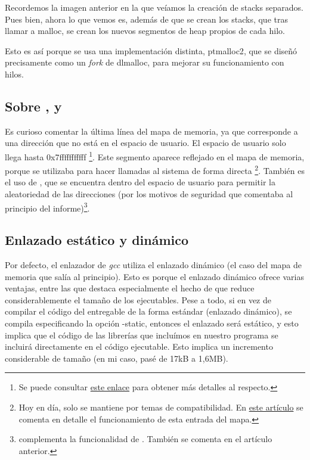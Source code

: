 \documentclass[a4paper]{article}
\begin{document}
Recordemos la imagen anterior en la que veíamos la creación de stacks separados. Pues bien, ahora lo que vemos es, además de que se crean los stacks, que tras llamar a {\ttfamily malloc}, se crean los nuevos segmentos de heap propios de cada hilo.

Esto es así porque se usa una implementación distinta, {\ttfamily ptmalloc2}, que se diseñó precisamente como un \emph{fork} de {\ttfamily dlmalloc}, para mejorar su funcionamiento con hilos.

\subsection{Sobre {\ttfamily [vsyscall]}, {\ttfamily [vdso]} y {\ttfamily [vvar]}}

Es curioso comentar la última línea del mapa de memoria, ya que corresponde a una dirección que no está en el espacio de usuario. El espacio de usuario solo llega hasta {\ttfamily 0x7fffffffffff} \footnote{Se puede consultar \href{https://www.kernel.org/doc/Documentation/x86/x86_64/mm.txt}{este enlace} para obtener más detalles al respecto.}. Este segmento aparece reflejado en el mapa de memoria, porque se utilizaba para hacer llamadas al sistema de forma directa \footnote{Hoy en día, solo se mantiene por temas de compatibilidad. En \href{https://lwn.net/Articles/446528/}{este artículo} se comenta en detalle el funcionamiento de esta entrada del mapa.}. También es el uso de {\ttfamily [vdso]}, que se encuentra dentro del espacio de usuario para permitir la aleatoriedad de las direcciones (por los motivos de seguridad que comentaba al principio del informe)\footnote{{\ttfamily [vvar]} complementa la funcionalidad de {\ttfamily [vdso]}. También se comenta en el artículo anterior.}.

\subsection{Enlazado estático y dinámico}

Por defecto, el enlazador de \emph{gcc} utiliza el enlazado dinámico (el caso del mapa de memoria que salía al principio). Esto es porque el enlazado dinámico ofrece varias ventajas, entre las que destaca especialmente el hecho de que reduce considerablemente el tamaño de los ejecutables. Pese a todo, si en vez de compilar el código del entregable de la forma estándar (enlazado dinámico), se compila especificando la opción {\ttfamily -static}, entonces el enlazado será estático, y esto implica que el código de las librerías que incluímos en nuestro programa se incluirá directamente en el código ejecutable. Esto implica un incremento considerable de tamaño (en mi caso, pasé de 17kB a 1,6MB).
\end{document}
